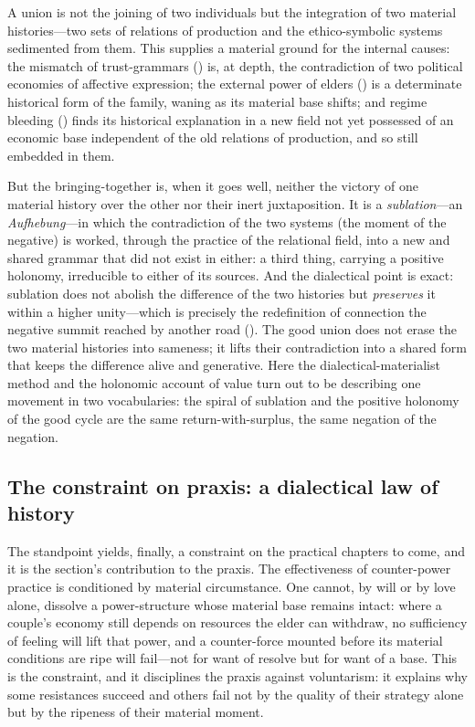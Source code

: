 \begin{claim}
A union is not the joining of two individuals but the integration of two material histories---two sets of relations of production and the ethico-symbolic systems sedimented from them. This supplies a material ground for the internal causes: the mismatch of trust-grammars () is, at depth, the contradiction of two political economies of affective expression; the external power of elders () is a determinate historical form of the family, waning as its material base shifts; and regime bleeding () finds its historical explanation in a new field not yet possessed of an economic base independent of the old relations of production, and so still embedded in them.
\end{claim}

\noindent
But the bringing-together is, when it goes well, neither the victory of one material history over the other nor their inert juxtaposition. It is a \emph{sublation}---an \emph{Aufhebung}---in which the contradiction of the two systems (the moment of the negative) is worked, through the practice of the relational field, into a new and shared grammar that did not exist in either: a third thing, carrying a positive holonomy, irreducible to either of its sources. And the dialectical point is exact: sublation does not abolish the difference of the two histories but \emph{preserves} it within a higher unity---which is precisely the redefinition of connection the negative summit reached by another road (). The good union does not erase the two material histories into sameness; it lifts their contradiction into a shared form that keeps the difference alive and generative. Here the dialectical-materialist method and the holonomic account of value turn out to be describing one movement in two vocabularies: the spiral of sublation and the positive holonomy of the good cycle are the same return-with-surplus, the same negation of the negation.

\subsection{The constraint on praxis: a dialectical law of history}
\label{p17:sub:histmat-law}

The standpoint yields, finally, a constraint on the practical chapters to come, and it is the section's contribution to the praxis. The effectiveness of counter-power practice is conditioned by material circumstance. One cannot, by will or by love alone, dissolve a power-structure whose material base remains intact: where a couple's economy still depends on resources the elder can withdraw, no sufficiency of feeling will lift that power, and a counter-force mounted before its material conditions are ripe will fail---not for want of resolve but for want of a base. This is the constraint, and it disciplines the praxis against voluntarism: it explains why some resistances succeed and others fail not by the quality of their strategy alone but by the ripeness of their material moment.

